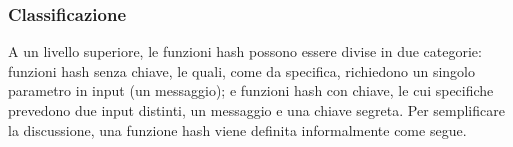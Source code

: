 \documentclass{article}
\theoremstyle{definition}
\begin{document}




\subsubsection{Classificazione}
A un livello superiore, le funzioni hash possono essere divise in due categorie: funzioni hash senza chiave, le quali, come da specifica, richiedono un singolo parametro in input (un messaggio); e funzioni hash con chiave, le cui specifiche prevedono due input distinti, un messaggio e una chiave segreta. Per semplificare la discussione, una funzione hash viene definita informalmente come segue.
\end{document}
